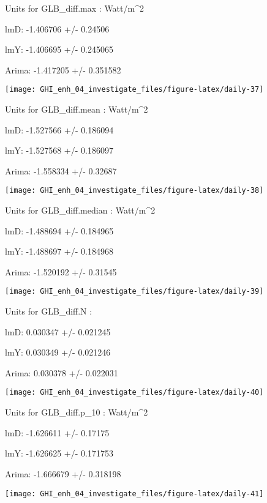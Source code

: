 \documentclass[
  10pt,
  a4paper,oneside]{article}
\begin{document}
Units for GLB\_diff.max : Watt/m\^{}2

lmD: -1.406706 +/- 0.24506

lmY: -1.406695 +/- 0.245065

Arima: -1.417205 +/- 0.351582

\begin{center}\texttt{[image: GHI\_enh\_04\_investigate\_files/figure-latex/daily-37]} \end{center}

Units for GLB\_diff.mean : Watt/m\^{}2

lmD: -1.527566 +/- 0.186094

lmY: -1.527568 +/- 0.186097

Arima: -1.558334 +/- 0.32687

\begin{center}\texttt{[image: GHI\_enh\_04\_investigate\_files/figure-latex/daily-38]} \end{center}

Units for GLB\_diff.median : Watt/m\^{}2

lmD: -1.488694 +/- 0.184965

lmY: -1.488697 +/- 0.184968

Arima: -1.520192 +/- 0.31545

\begin{center}\texttt{[image: GHI\_enh\_04\_investigate\_files/figure-latex/daily-39]} \end{center}

Units for GLB\_diff.N :

lmD: 0.030347 +/- 0.021245

lmY: 0.030349 +/- 0.021246

Arima: 0.030378 +/- 0.022031

\begin{center}\texttt{[image: GHI\_enh\_04\_investigate\_files/figure-latex/daily-40]} \end{center}

Units for GLB\_diff.p\_10 : Watt/m\^{}2

lmD: -1.626611 +/- 0.17175

lmY: -1.626625 +/- 0.171753

Arima: -1.666679 +/- 0.318198

\begin{center}\texttt{[image: GHI\_enh\_04\_investigate\_files/figure-latex/daily-41]} \end{center}
\end{document}
